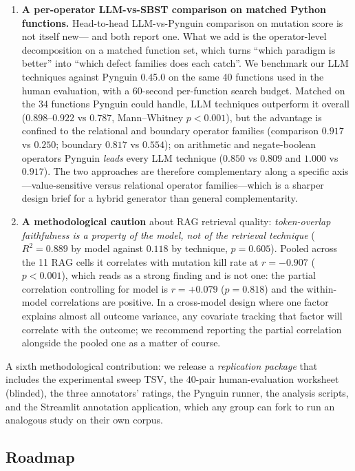 \documentclass[smallextended]{svjour3}
\begin{document}
\begin{enumerate}
\item \textbf{A per-operator LLM-vs-SBST comparison on matched
 Python functions.} Head-to-head LLM-vs-Pynguin comparison on
 mutation score is not itself new---\citet{dakhel2024mutation} and
 \citet{straubinger2025debug} both report one. What we add is the
 operator-level decomposition on a matched function set, which
 turns ``which paradigm is better'' into ``which defect families
 does each catch''. We benchmark our LLM techniques against
 Pynguin 0.45.0 on the same 40 functions used in the human
 evaluation, with a 60-second per-function search budget. Matched on
 the 34 functions Pynguin could handle, LLM techniques outperform it
 overall ($0.898$--$0.922$ vs $0.787$, Mann--Whitney $p < 0.001$),
 but the advantage is confined to the relational and boundary
 operator families (comparison $0.917$ vs $0.250$; boundary $0.817$
 vs $0.554$); on arithmetic and negate-boolean operators Pynguin
 \emph{leads} every LLM technique ($0.850$ vs $0.809$ and $1.000$ vs
 $0.917$). The two approaches are therefore
 complementary along a specific axis---value-sensitive versus
 relational operator families---which is a sharper design brief for
 a hybrid generator than general complementarity.

\item \textbf{A methodological caution} about RAG retrieval
 quality: \emph{token-overlap faithfulness is a property of the
 model, not of the retrieval technique} ($R^2 = 0.889$ by model
 against $0.118$ by technique, $p = 0.605$). Pooled across the 11 RAG
 cells it correlates with mutation kill rate at $r = -0.907$
 ($p < 0.001$), which reads as a strong finding and is not one: the
 partial correlation controlling for model is $r = +0.079$
 ($p = 0.818$) and the within-model correlations are positive. In a
 cross-model design where one factor explains almost all outcome
 variance, any covariate tracking that factor will correlate with
 the outcome; we recommend reporting the partial correlation
 alongside the pooled one as a matter of course.
\end{enumerate}

A sixth methodological contribution: we release a
\emph{replication package} that includes the experimental sweep
TSV, the 40-pair human-evaluation worksheet (blinded), the three
annotators' ratings, the Pynguin runner, the analysis scripts, and
the Streamlit annotation application, which any group can fork to
run an analogous study on their own corpus.

\subsection{Roadmap}\label{sec:intro-roadmap}
\end{document}
